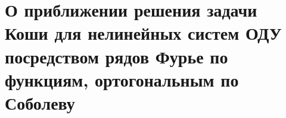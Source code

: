 \chapter{О приближении решения задачи Коши для нелинейных систем ОДУ посредством рядов Фурье по функциям, ортогональным по Соболеву}











